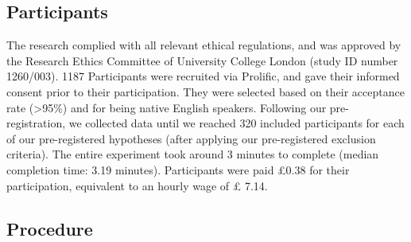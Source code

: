 \documentclass[12pt,twoside]{reedthesis}
\begin{document}
\hypertarget{participants}{%
\subsection{Participants}\label{participants}}

The research complied with all relevant ethical regulations, and was approved by the Research Ethics Committee of University College London (study ID number 1260/003). 1187 Participants were recruited via Prolific, and gave their informed consent prior to their participation. They were selected based on their acceptance rate (\textgreater95\%) and for being native English speakers. Following our pre-registration, we collected data until we reached 320 included participants for each of our pre-registered hypotheses (after applying our pre-registered exclusion criteria). The entire experiment took around 3 minutes to complete (median completion time: 3.19 minutes). Participants were paid £0.38 for their participation, equivalent to an hourly wage of £ 7.14.

\hypertarget{procedure}{%
\subsection{Procedure}\label{procedure}}
\end{document}
